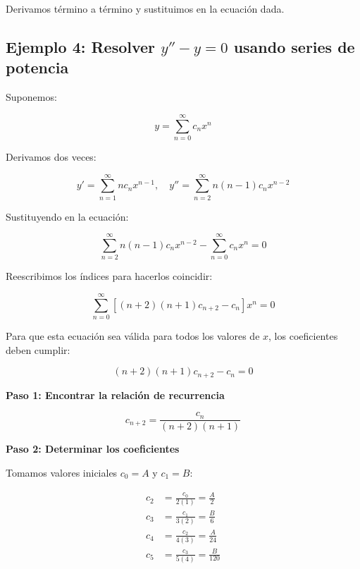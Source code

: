 Derivamos término a término y sustituimos en la ecuación dada.

\subsection*{Ejemplo 4: Resolver \( y'' - y = 0 \) usando series de potencia}
Suponemos:

\begin{equation}
y = \sum_{n=0}^{\infty} c_n x^n
\end{equation}

Derivamos dos veces:

\begin{equation}
y' = \sum_{n=1}^{\infty} n c_n x^{n-1}, \quad y'' = \sum_{n=2}^{\infty} n(n-1) c_n x^{n-2}
\end{equation}

Sustituyendo en la ecuación:

\begin{equation}
\sum_{n=2}^{\infty} n(n-1) c_n x^{n-2} - \sum_{n=0}^{\infty} c_n x^n = 0
\end{equation}

Reescribimos los índices para hacerlos coincidir:

\begin{equation}
\sum_{n=0}^{\infty} \left[ (n+2)(n+1) c_{n+2} - c_n \right] x^n = 0
\end{equation}

Para que esta ecuación sea válida para todos los valores de \( x \), los coeficientes deben cumplir:

\begin{equation}
(n+2)(n+1) c_{n+2} - c_n = 0
\end{equation}

\textbf{Paso 1: Encontrar la relación de recurrencia}

\begin{equation}
c_{n+2} = \frac{c_n}{(n+2)(n+1)}
\end{equation}

\textbf{Paso 2: Determinar los coeficientes}

Tomamos valores iniciales \( c_0 = A \) y \( c_1 = B \):

\begin{align*}
c_2 &= \frac{c_0}{2(1)} = \frac{A}{2} \\
c_3 &= \frac{c_1}{3(2)} = \frac{B}{6} \\
c_4 &= \frac{c_2}{4(3)} = \frac{A}{24} \\
c_5 &= \frac{c_3}{5(4)} = \frac{B}{120}
\end{align*}

